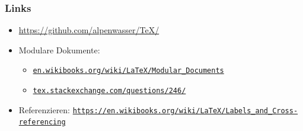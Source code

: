 \documentclass{beamer}                %
\begin{document}
\begin{frame} %
    \frametitle{Links}
    \begin{itemize}
        \item
            \alert{\href{https://github.com/alpenwasser/TeX/}
                        {https://github.com/alpenwasser/TeX/}}
        \item
            Modulare Dokumente:
            \begin{itemize}
                \item
                    \href{https://en.wikibooks.org/wiki/LaTeX/Modular_Documents}
                         {\nolinkurl{en.wikibooks.org/wiki/LaTeX/Modular_Documents}}
                 \item
                     \href{https://tex.stackexchange.com/questions/246/}
                          {\nolinkurl{tex.stackexchange.com/questions/246/}}
            \end{itemize}
        \item
            Referenzieren:
            \href{https://en.wikibooks.org/wiki/LaTeX/Labels_and_Cross-referencing}
                 {\nolinkurl{https://en.wikibooks.org/wiki/LaTeX/Labels_and_Cross-referencing}}
    \end{itemize}
\end{frame}


\end{document}
